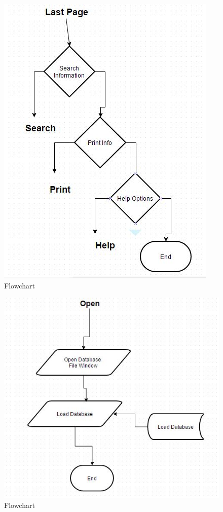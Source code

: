\begin{figure}[H]
    \includegraphics[width=\textwidth]{DesignAlg2.JPG}
    \caption{Flowchart} \label{fig:Flowchart}
\end{figure}

\begin{figure}[H]
    \includegraphics[width=\textwidth]{DesignAlg3.JPG}
    \caption{Flowchart} \label{fig:Flowchart}
\end{figure}

